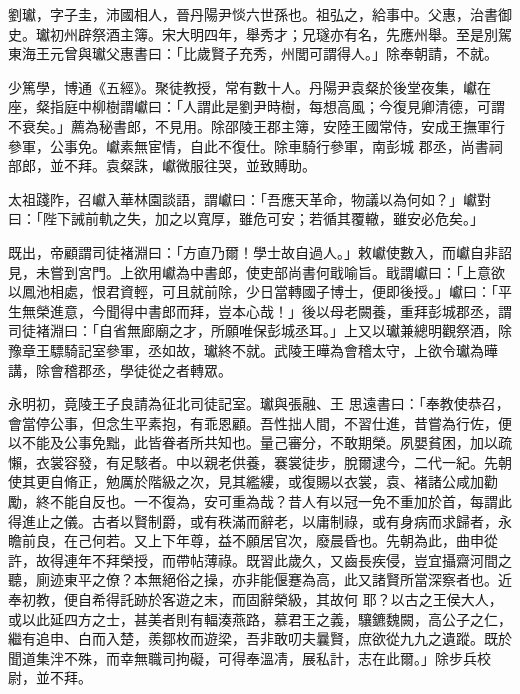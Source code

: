 
\begin{pinyinscope}

 劉瓛，字子圭，沛國相人，晉丹陽尹惔六世孫也。祖弘之，給事中。父惠，治書御史。瓛初州辟祭酒主簿。宋大明四年，舉秀才；兄璲亦有名，先應州舉。至是別駕東海王元曾與瓛父惠書曰：「比歲賢子充秀，州閭可謂得人。」除奉朝請，不就。



 少篤學，博通《五經》。聚徒教授，常有數十人。丹陽尹袁粲於後堂夜集，巘在座，粲指庭中柳樹謂巘曰：「人謂此是劉尹時樹，每想高風；今復見卿清德，可謂不衰矣。」薦為秘書郎，不見用。除邵陵王郡主簿，安陸王國常侍，安成王撫軍行參軍，公事免。巘素無宦情，自此不復仕。除車騎行參軍，南彭城
 郡丞，尚書祠部郎，並不拜。袁粲誅，巘微服往哭，並致賻助。



 太祖踐阼，召巘入華林園談語，謂巘曰：「吾應天革命，物議以為何如？」巘對曰：「陛下誡前軌之失，加之以寬厚，雖危可安；若循其覆轍，雖安必危矣。」



 既出，帝顧謂司徒褚淵曰：「方直乃爾！學士故自過人。」敕巘使數入，而巘自非詔見，未嘗到宮門。上欲用巘為中書郎，使吏部尚書何戢喻旨。戢謂巘曰：「上意欲以鳳池相處，恨君資輕，可且就前除，少日當轉國子博士，便即後授。」巘曰：「平生無榮進意，今聞得中書郎而拜，豈本心哉！」後以母老闕養，重拜彭城郡丞，謂司徒褚淵曰：「自省無廊廟之才，所願唯保彭城丞耳。」上又以瓛兼總明觀祭酒，除豫章王驃騎記室參軍，丞如故，瓛終不就。武陵王曄為會稽太守，上欲令瓛為曄講，除會稽郡丞，學徒從之者轉眾。



 永明初，竟陵王子良請為征北司徒記室。瓛與張融、王
 思遠書曰：「奉教使恭召，會當停公事，但念生平素抱，有乖恩顧。吾性拙人間，不習仕進，昔嘗為行佐，便以不能及公事免黜，此皆眷者所共知也。量己審分，不敢期榮。夙嬰貧困，加以疏懶，衣裳容發，有足駭者。中以親老供養，褰裳徒步，脫爾逮今，二代一紀。先朝使其更自脩正，勉厲於階級之次，見其繿縷，或復賜以衣裳，袁、褚諸公咸加勸勵，終不能自反也。一不復為，安可重為哉？昔人有以冠一免不重加於首，每謂此得進止之儀。古者以賢制爵，或有秩滿而辭老，以庸制祿，或有身病而求歸者，永瞻前良，在己何若。又上下年尊，益不願居官次，廢晨昏也。先朝為此，曲申從許，故得連年不拜榮授，而帶帖薄祿。既習此歲久，又齒長疾侵，豈宜攝齋河間之聽，廁迹東平之僚？本無絕俗之操，亦非能偃蹇為高，此又諸賢所當深察者也。近奉初教，便自希得託跡於客遊之末，而固辭榮級，其故何
 耶？以古之王侯大人，或以此延四方之士，甚美者則有輻湊燕路，慕君王之義，驤鑣魏闕，高公子之仁，繼有追申、白而入楚，羨鄒枚而遊梁，吾非敢叨夫曩賢，庶欲從九九之遺蹤。既於聞道集泮不殊，而幸無職司拘礙，可得奉溫凊，展私計，志在此爾。」除步兵校尉，並不拜。




\end{pinyinscope}
